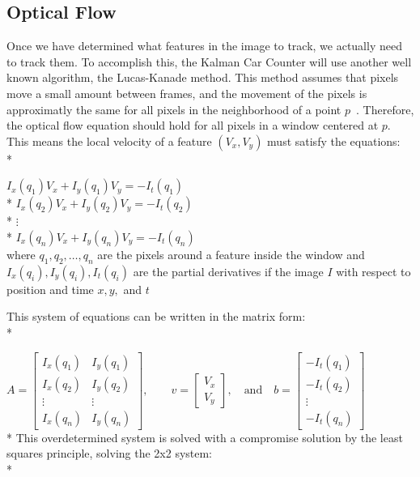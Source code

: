 \documentclass{article} %
\begin{document}
\subsection{Optical Flow}
Once we have determined what features in the image to track, we actually need to track them. To accomplish this, the Kalman Car Counter will use another well known algorithm, the Lucas-Kanade method. This method assumes that pixels move a small amount between frames, and the movement of the pixels is approximatly the same for all pixels in the neighborhood of a point $p$~\cite{lucas1981iterative}. Therefore, the optical flow equation should hold for all pixels in a window centered at $p$. This means the local velocity of a feature $(V_x,V_y)$ must satisfy the equations:\\*

{\centering
$I_x(q_1) V_x + I_y (q_1) V_y = -I_t(q_1)$\\*
$I_x(q_2) V_x + I_y (q_2) V_y = -I_t(q_2)$\\*
$\vdots$\\*
$I_x(q_n) V_x + I_y (q_n) V_y = -I_t(q_n)$\linebreak\newline\\
}
where $q_1,q_2,\dots,q_n$ are the pixels around a feature inside the window and $I_x(q_i),I_y(q_i),I_t(q_i)$ are the partial derivatives if the image $I$ with respect to position and time $x,y,$ and $t$

This system of equations can be written in the matrix form:\\*

{\centering
$A = \begin{bmatrix}
I_x(q_1) & I_y(q_1) \\[10pt]
I_x(q_2) & I_y(q_2) \\[10pt]
\vdots  & \vdots  \\[10pt]
I_x(q_n) & I_y(q_n) 
\end{bmatrix},
\quad\quad
v = 
\begin{bmatrix}
V_x\\[10pt]
V_y
\end{bmatrix},
\quad \mbox{and}\quad
b = 
\begin{bmatrix}
-I_t(q_1) \\[10pt]
-I_t(q_2) \\[10pt]
\vdots  \\[10pt]
-I_t(q_n)
\end{bmatrix}
$\linebreak\newline\\*}
This overdetermined system is solved with a compromise solution by the least squares principle, solving the 2x2 system:\\*
\end{document}
